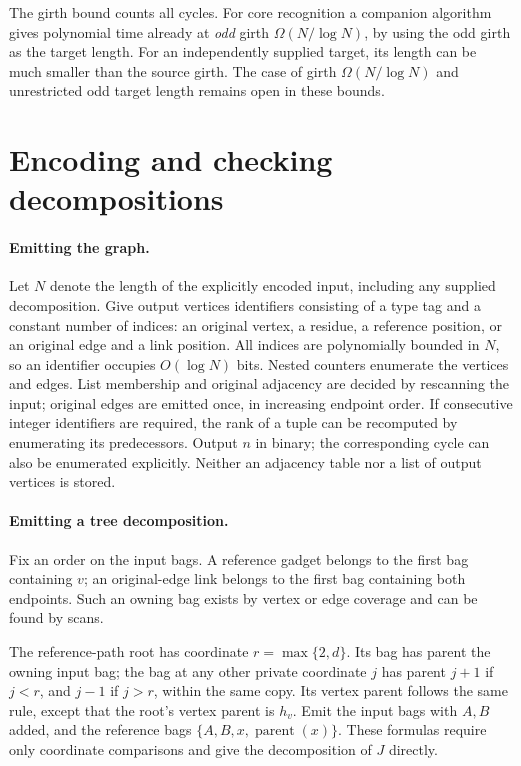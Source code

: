 \documentclass[11pt]{article}
\theoremstyle{remark}
\begin{document}
The girth bound counts all cycles. For core recognition a companion
algorithm~\cite{longnote} gives polynomial time already at \emph{odd}
girth $\Omega(N/\log N)$, by using the odd girth as the target length.
For an independently supplied target, its length can be much smaller
than the source girth. The case of girth $\Omega(N/\log N)$ and unrestricted
odd target length remains open in these bounds.

\appendix
\section{Encoding and checking decompositions}\label{app:cert}
\paragraph{Emitting the graph.}
Let $N$ denote the length of the explicitly encoded input, including any
supplied decomposition. Give output vertices identifiers consisting of a
type tag and a constant number of indices: an original vertex, a residue,
a reference position, or an original edge and a link position. All indices
are polynomially bounded in $N$, so an identifier occupies $O(\log N)$
bits. Nested counters enumerate the vertices and edges. List membership
and original adjacency are decided by rescanning the input; original
edges are emitted once, in increasing endpoint order. If consecutive
integer identifiers are required, the rank of a tuple can be recomputed
by enumerating its predecessors. Output $n$ in binary; the corresponding
cycle can also be enumerated explicitly.
Neither an adjacency table nor a list of output vertices is stored.

\paragraph{Emitting a tree decomposition.}
Fix an order on the input bags. A reference gadget belongs to the first
bag containing $v$; an original-edge link belongs to the first bag
containing both endpoints. Such an owning bag exists by vertex or edge
coverage and can be found by scans.

The reference-path root has coordinate $r=\max\{2,d\}$. Its bag has
parent the owning input bag; the bag at any other private coordinate $j$
has parent $j+1$ if $j<r$, and $j-1$ if $j>r$, within the same copy.
Its vertex parent follows the same rule, except that the root's vertex
parent is $h_v$. Emit the input bags with $A,B$ added, and the reference
bags $\{A,B,x,\operatorname{parent}(x)\}$. These formulas require only
coordinate comparisons and give the decomposition of $J$ directly.
\end{document}
